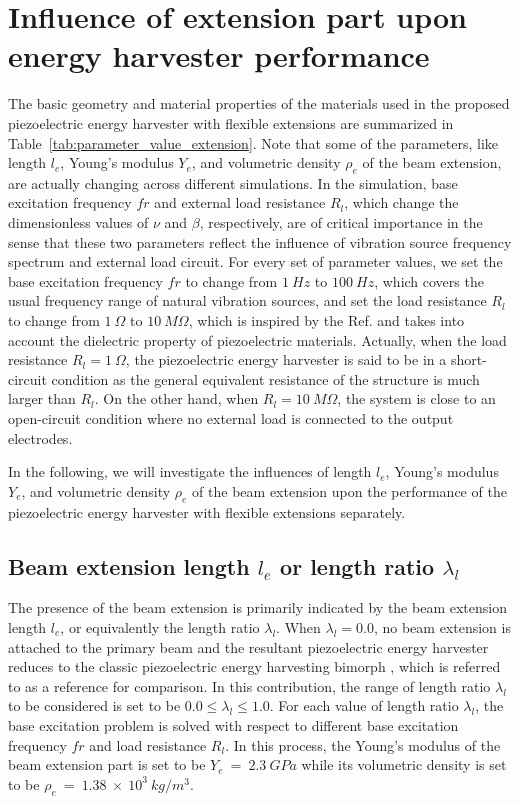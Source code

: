 \documentclass{elsarticle}
\begin{document}
\section{Influence of extension part upon energy harvester performance}


The basic geometry and material properties of the materials used in the proposed piezoelectric energy harvester with flexible extensions are summarized in Table~\ref{tab:parameter_value_extension}. Note that some of the parameters, like length $l_e$, Young's modulus $Y_e$, and volumetric density $\rho_e$ of the beam extension, are actually changing across different simulations. In the simulation, base excitation frequency $fr$ and external load resistance $R_l$, which change the dimensionless values of $\nu$ and $\beta$, respectively, are of critical importance in the sense that these two parameters reflect the influence of vibration source frequency spectrum and external load circuit. For every set of parameter values, we set the base excitation frequency $fr$ to change from $1\ Hz$ to $100\ Hz$, which covers the usual frequency range of natural vibration sources, and set the load resistance $R_l$ to change from $1\ \Omega$ to $10\ M\Omega$, which is inspired by the Ref. \cite{erturk2009experimentally} and takes into account the dielectric property of piezoelectric materials. Actually, when the load resistance $R_l = 1\ \Omega$, the piezoelectric energy harvester is said to be in a short-circuit condition as the general equivalent resistance of the structure is much larger than $R_l$. On the other hand, when $R_l = 10\ M\Omega$, the system is close to an open-circuit condition where no external load is connected to the output electrodes.

In the following, we will investigate the influences of length $l_e$, Young's modulus $Y_e$, and volumetric density $\rho_e$ of the beam extension upon the performance of the piezoelectric energy harvester with flexible extensions separately.

\subsection{Beam extension length $l_e$ or length ratio $\lambda_l$}

The presence of the beam extension is primarily indicated by the beam extension length $l_e$, or equivalently the length ratio $\lambda_l$. When $\lambda_l = 0.0$, no beam extension is attached to the primary beam and the resultant piezoelectric energy harvester reduces to the classic piezoelectric energy harvesting bimorph \cite{erturk2009experimentally}, which is referred to as a reference for comparison. In this contribution, the range of length ratio $\lambda_l$ to be considered is set to be $0.0 \leq \lambda_l \leq 1.0$. For each value of length ratio $\lambda_l$, the base excitation problem is solved with respect to different base excitation frequency $fr$ and load resistance $R_l$. In this process, the Young's modulus of the beam extension part is set to be $Y_e\ =\ 2.3\ GPa$ while its volumetric density is set to be $\rho_e\ =\ 1.38\ \times\ 10^3\ kg/m^3$.
\end{document}
